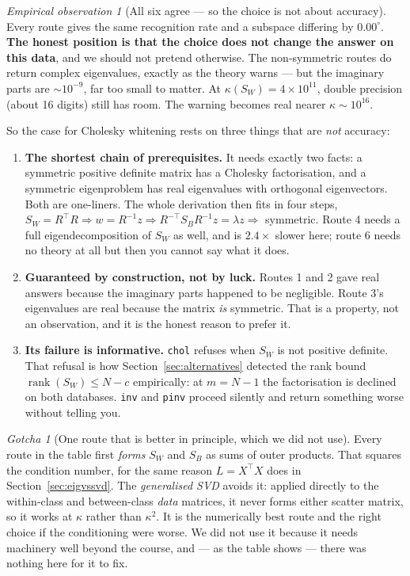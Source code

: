 \documentclass[11pt]{article}
\theoremstyle{definition}
\theoremstyle{remark}
\newtheorem*{gotcha}{Gotcha}
\newtheorem*{observation}{Empirical observation}
\newcommand{\Sw}{S_W}
\newcommand{\Sb}{S_B}
\newcommand{\rank}{\operatorname{rank}}
\begin{document}
\begin{observation}[All six agree --- so the choice is not about accuracy]
Every route gives the same recognition rate and a subspace differing by
$0.00^\circ$. \textbf{The honest position is that the choice does not change the
answer on this data}, and we should not pretend otherwise. The non-symmetric
routes do return complex eigenvalues, exactly as the theory warns --- but the
imaginary parts are $\sim10^{-9}$, far too small to matter. At
$\kappa(\Sw)=4\times10^{11}$, double precision (about 16 digits) still has room.
The warning becomes real nearer $\kappa\sim10^{16}$.
\end{observation}

So the case for Cholesky whitening rests on three things that are \emph{not}
accuracy:

\begin{enumerate}[leftmargin=*,label=\arabic*.]
\item \textbf{The shortest chain of prerequisites.} It needs exactly two facts:
  a symmetric positive definite matrix has a Cholesky factorisation, and a
  symmetric eigenproblem has real eigenvalues with orthogonal eigenvectors. Both
  are one-liners. The whole derivation then fits in four steps,
  $\Sw=R^{\!\top}R \Rightarrow w=R^{-1}z \Rightarrow R^{-\top}\Sb R^{-1}z=\lambda z
  \Rightarrow$ symmetric. Route 4 needs a full eigendecomposition of $\Sw$ as
  well, and is $2.4\times$ slower here; route 6 needs no theory at all but then
  you cannot say what it does.
\item \textbf{Guaranteed by construction, not by luck.} Routes 1 and 2 gave real
  answers because the imaginary parts happened to be negligible. Route 3's
  eigenvalues are real because the matrix \emph{is} symmetric. That is a property,
  not an observation, and it is the honest reason to prefer it.
\item \textbf{Its failure is informative.} \texttt{chol} refuses when $\Sw$ is not
  positive definite. That refusal is how Section~\ref{sec:alternatives} detected
  the rank bound $\rank(\Sw)\le N-c$ empirically: at $m=N-1$ the factorisation is
  declined on both databases. \texttt{inv} and \texttt{pinv} proceed silently and
  return something worse without telling you.
\end{enumerate}

\begin{gotcha}[One route that is better in principle, which we did not use]
Every route in the table first \emph{forms} $\Sw$ and $\Sb$ as sums of outer
products. That squares the condition number, for the same reason
$L=X^{\!\top}\!X$ does in Section~\ref{sec:eigvssvd}. The \emph{generalised SVD}
avoids it: applied directly to the within-class and between-class \emph{data}
matrices, it never forms either scatter matrix, so it works at $\kappa$ rather
than $\kappa^2$. It is the numerically best route and the right choice if the
conditioning were worse. We did not use it because it needs machinery well
beyond the course, and --- as the table shows --- there was nothing here for it
to fix.
\end{gotcha}
\end{document}
